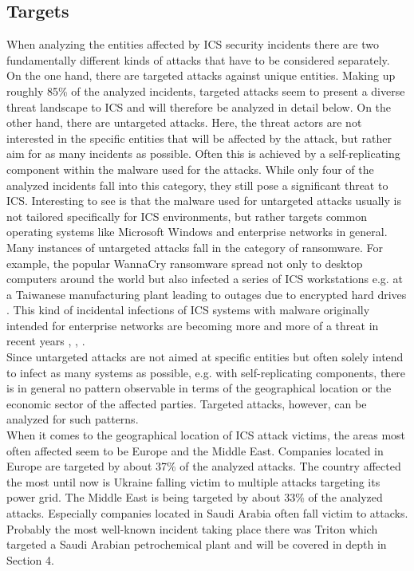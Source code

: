 \documentclass[runningheads]{llncs}
\begin{document}
\subsection{Targets}
When analyzing the entities affected by ICS security incidents there are two fundamentally different kinds of attacks that have to be considered separately.
On the one hand, there are targeted attacks against unique entities.
Making up roughly 85\% of the analyzed incidents, targeted attacks seem to present a diverse threat landscape to ICS and will therefore be analyzed in detail below.
On the other hand, there are untargeted attacks.
Here, the threat actors are not interested in the specific entities that will be affected by the attack, but rather aim for as many incidents as possible.
Often this is achieved by a self-replicating component within the malware used for the attacks.
While only four of the analyzed incidents fall into this category, they still pose a significant threat to ICS.
Interesting to see is that the malware used for untargeted attacks usually is not tailored specifically for ICS environments, but rather targets common operating systems like Microsoft Windows and enterprise networks in general.
Many instances of untargeted attacks fall in the category of ransomware.
For example, the popular WannaCry ransomware spread not only to desktop computers around the world but also infected a series of ICS workstations e.g. at a Taiwanese manufacturing plant leading to outages due to encrypted hard drives \cite{skybox.18}.
This kind of incidental infections of ICS systems with malware originally intended for enterprise networks are becoming more and more of a threat in recent years \cite{dragos.19}, \cite{cyberx.19}, \cite{zimba.18}.\\
Since untargeted attacks are not aimed at specific entities but often solely intend to infect as many systems as possible, e.g. with self-replicating components, there is in general no pattern observable in terms of the geographical location or the economic sector of the affected parties.
Targeted attacks, however, can be analyzed for such patterns.\\
When it comes to the geographical location of ICS attack victims, the areas most often affected seem to be Europe and the Middle East.
Companies located in Europe are targeted by about 37\% of the analyzed attacks. The country affected the most until now is Ukraine falling victim to multiple attacks targeting its power grid.
The Middle East is being targeted by about 33\% of the analyzed attacks. Especially companies located in Saudi Arabia often fall victim to attacks. Probably the most well-known incident taking place there was Triton which targeted a Saudi Arabian petrochemical plant and will be covered in depth in Section 4.
\end{document}
